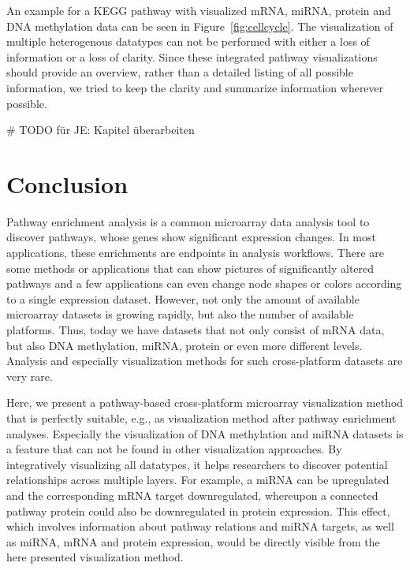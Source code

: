 \documentclass{bioinfo}
\begin{document}
An example for a KEGG pathway with visualized mRNA, miRNA, protein and DNA methylation data can be
seen in Figure~\ref{fig:cellcycle}. The visualization of multiple heterogenous datatypes can not be
performed with either a loss of information or a loss of clarity. Since these integrated pathway
visualizations should provide an overview, rather than a detailed listing of all possible
information, we tried to keep the clarity and summarize information wherever possible.




# TODO für JE: Kapitel überarbeiten
\section{Conclusion}

Pathway enrichment analysis is a common microarray data analysis tool to discover pathways, whose
genes show significant expression changes. In most applications, these enrichments are endpoints in
analysis workflows. There are some methods or applications that can show pictures of significantly
altered pathways and a few applications can even change node shapes or colors according to a single
expression dataset. However, not only the amount of available microarray datasets is growing
rapidly, but also the number of available platforms. Thus, today we have datasets that not only
consist of mRNA data, but also DNA methylation, miRNA, protein or even more different
levels. Analysis and especially visualization methods for such cross-platform datasets are very
rare.

Here, we present a pathway-based cross-platform microarray visualization method that is perfectly
suitable, e.g., as visualization method after pathway enrichment analyses. Especially the
visualization of DNA methylation and miRNA datasets is a feature that can not be found in other
visualization approaches. By integratively visualizing all datatypes, it helps researchers to
discover potential relationships across multiple layers. For example, a miRNA can be upregulated and
the corresponding mRNA target downregulated, whereupon a connected pathway protein could also be
downregulated in protein expression. This effect, which involves information about pathway relations
and miRNA targets, as well as miRNA, mRNA and protein expression, would be directly visible from the
here presented visualization method.
\end{document}
